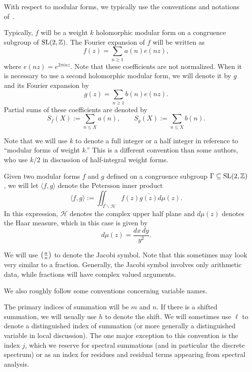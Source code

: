 With respect to modular forms, we typically use the conventions and notations
of~\cite{Bump98, Goldfeld2006automorphic}.


Typically, $f$ will be a weight $k$ holomorphic modular form on a congruence subgroup of
$\operatorname{SL}(2, \mathbb{Z})$.
The Fourier expansion of $f$ will be written as
\begin{equation}
  f(z) = \sum_{n \geq 1} a(n) e(nz),
\end{equation}
where $e(nz) = e^{2\pi i n z}$.
Note that these coefficients are not normalized.
When it is necessary to use a second holomorphic modular form, we will denote it by $g$
and its Fourier expansion by
\begin{equation}
  g(z) = \sum_{n \geq 1} b(n) e(nz).
\end{equation}
Partial sums of these coefficients are denoted by
\begin{equation}
  S_f(X) := \sum_{n \leq X} a(n), \qquad S_g(X) := \sum_{n \leq X} b(n).
\end{equation}


Note that we will use $k$ to denote a full integer or a half integer in reference to
``modular forms of weight $k$.''
This is a different convention than some authors, who use $k/2$ in discussion of
half-integral weight forms.


Given two modular forms $f$ and $g$ defined on a congruence subgroup $\Gamma \subseteq
\operatorname{SL}(2, \mathbb{Z})$, we will let $\langle f, g \rangle$ denote the Petersson inner
product
\begin{equation}
  \langle f, g \rangle := \iint_{\Gamma \backslash \mathcal{H}} f(z) \overline{g(z)}
  d\mu(z).
\end{equation}
In this expression, $\mathcal{H}$ denotes the complex upper half plane and $d\mu(z)$
denotes the Haar measure, which in this case is given by
\begin{equation}
  d\mu(z) = \frac{dx\, dy}{y^2}.
\end{equation}


We will use $\left(\frac{a}{n}\right)$ to denote the Jacobi symbol.
Note that this sometimes may look very similar to a fraction.
Generally, the Jacobi symbol involves only arithmetic data, while fractions will have
complex valued arguments.


We also roughly follow some conventions concerning variable names.


The primary indices of summation will be $m$ and $n$.
If there is a shifted summation, we will usually use $h$ to denote the shift.
We will sometimes use $\ell$ to denote a distinguished index of summation (or more
generally a distinguished variable in local discussion).
The one major exception to this convention is the index $j$, which we reserve for spectral
summations (and in particular the discrete spectrum) or as an index for residues and
residual terms appearing from spectral analysis.



